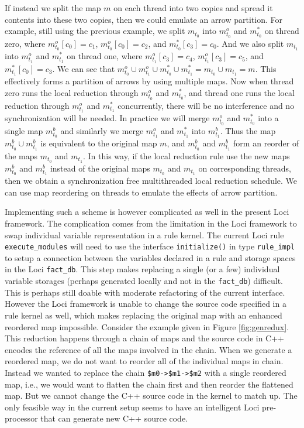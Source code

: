 \documentclass{article}
\begin{document}
If instead we split the map $m$ on each thread into two copies and
spread it contents into these two copies, then we could emulate an arrow
partition.  For example, still using the previous example, we split
$m_{t_0}$ into $m^o_{t_0}$ and $m^*_{t_0}$ on thread zero, where
$m^o_{t_0}[c_0] = c_1$, $m^o_{t_0}[c_0] = c_2$, and $m^*_{t_0}[c_3] =
c_0$.  And we also split $m_{t_1}$ into $m^o_{t_1}$ and $m^*_{t_1}$ on
thread one, where $m^o_{t_1}[c_3] = c_4$, $m^o_{t_1}[c_3] = c_5$, and
$m^*_{t_1}[c_0] = c_3$.  We can see that $m^o_{t_0} \cup m^o_{t_1} \cup
m^*_{t_0} \cup m^*_{t_1} = m_{t_0} \cup m_{t_1} = m$.  This effectively
forms a partition of arrows by using multiple maps.  Now when thread
zero runs the local reduction through $m^o_{t_0}$ and $m^*_{t_0}$, and
thread one runs the local reduction through $m^o_{t_1}$ and $m^*_{t_1}$
concurrently, there will be no interference and no synchronization will
be needed.  In practice we will merge $m^o_{t_0}$ and $m^*_{t_0}$ into a
single map $m^b_{t_0}$ and similarly we merge $m^o_{t_1}$ and $m^*_{t_1}$
into $m^b_{t_1}$.  Thus the map $m^b_{t_0} \cup m^b_{t_1}$ is equivalent
to the original map $m$, and $m^b_{t_0}$ and $m^b_{t_1}$ form an reorder
of the maps $m_{t_0}$ and $m_{t_1}$.  In this way, if the local
reduction rule use the new maps $m^b_{t_0}$ and $m^b_{t_1}$ instead of
the original maps $m_{t_0}$ and $m_{t_1}$ on corresponding threads, then
we obtain a synchronization free multithreaded local reduction schedule.
We can use map reordering on threads to emulate the effects of arrow
partition.

Implementing such a scheme is however complicated as well in the present
Loci framework.  The complication comes from the limitation in the Loci
framework to swap individual variable representation in a rule kernel.
The current Loci rule \lstinline{execute_modules} will need to use the
interface \lstinline{initialize()} in type \lstinline{rule_impl} to
setup a connection between the variables declared in a rule and storage
spaces in the Loci \lstinline{fact_db}.  This step makes replacing a
single (or a few) individual variable storages (perhaps generated
locally and not in the \lstinline{fact_db}) difficult.  This is perhaps
still doable with moderate refactoring of the current interface.
However the Loci framework is unable to change the source code specified
in a rule kernel as well, which makes replacing the original map with an
enhanced reordered map impossible.  Consider the example given in Figure
\ref{fig:genredux}.  This reduction happens through a chain of maps and
the source code in C++ encodes the reference of all the maps involved in
the chain.  When we generate a reordered map, we do not want to reorder
all of the individual maps in chain.  Instead we wanted to replace the
chain \texttt{\$m0->\$m1->\$m2} with a single reordered map, i.e., we
would want to flatten the chain first and then reorder the flattened map.
But we cannot change the C++ source code in the kernel to match up.  The
only feasible way in the current setup seems to have an intelligent Loci
pre-processor that can generate new C++ source code.
\end{document}
